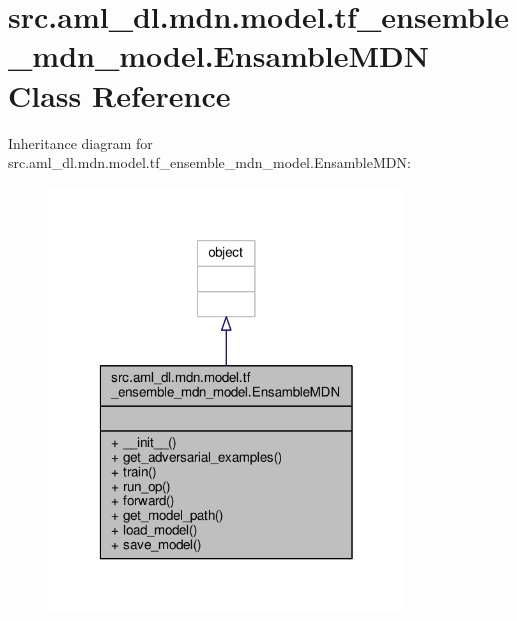 \hypertarget{classsrc_1_1aml__dl_1_1mdn_1_1model_1_1tf__ensemble__mdn__model_1_1_ensamble_m_d_n}{\section{src.\-aml\-\_\-dl.\-mdn.\-model.\-tf\-\_\-ensemble\-\_\-mdn\-\_\-model.\-Ensamble\-M\-D\-N Class Reference}
\label{classsrc_1_1aml__dl_1_1mdn_1_1model_1_1tf__ensemble__mdn__model_1_1_ensamble_m_d_n}
}


Inheritance diagram for src.\-aml\-\_\-dl.\-mdn.\-model.\-tf\-\_\-ensemble\-\_\-mdn\-\_\-model.\-Ensamble\-M\-D\-N\-:\nopagebreak
\begin{figure}[H]
\begin{center}
\leavevmode
\includegraphics[width=268pt]{classsrc_1_1aml__dl_1_1mdn_1_1model_1_1tf__ensemble__mdn__model_1_1_ensamble_m_d_n__inherit__graph}
\end{center}
\end{figure}


